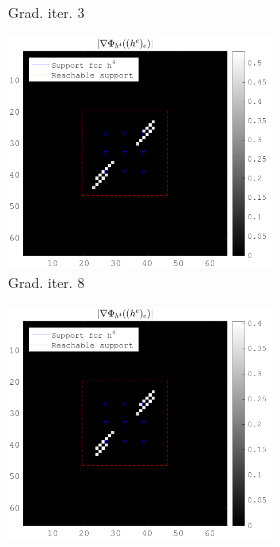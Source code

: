 \begin{figure}[!h]
\begin{subfigure}[b]{0.49\textwidth}
\begin{subfigure}[b]{0.49\textwidth}
	\caption{Grad. iter. 3}
	\end{subfigure}
	\begin{subfigure}[b]{0.49\textwidth}\centering
	\includegraphics[width=\textwidth]{figures/xp_grad_iterations/xp_128x128_sc2_angl1_K3_S3_node4_8thiteration_partgrad4_bestvalues.png}
	\caption{Grad. iter. 8}
	\end{subfigure}
	\begin{subfigure}[b]{0.49\textwidth}\centering
	\includegraphics[width=\textwidth]{figures/xp_grad_iterations/xp_128x128_sc2_angl1_K3_S3_node4_20thiteration_partgrad4_bestvalues.png}

\end{subfigure}
\end{subfigure}
\end{figure}
